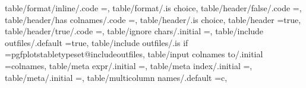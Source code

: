 {{{{{{{{{{{{{{{{{{{{{{{{{{{{{{{table/format/inline/.code                                          ={\def\pgfplotstableread@FORMAT@CASE{1}},                                                                                           
table/format/.is choice,
table/header/false/.code                                           ={\pgfplotstable@firstline@is@headerfalse\pgfplotstable@search@headerfalse},                                                        
table/header/has colnames/.code                                    ={\pgfplotstable@firstline@is@headertrue\pgfplotstable@search@headerfalse},                                                         
table/header/.is choice,
table/header                                                       =true,                                                                                                                              
table/header/true/.code                                            ={\pgfplotstable@firstline@is@headerfalse\pgfplotstable@search@headertrue},                                                         
table/ignore chars/.initial                                        =,                                                                                                                                  
table/include outfiles/.default                                    =true,                                                                                                                              
table/include outfiles/.is if                                      =pgfplotstabletypeset@includeoutfiles,                                                                                              
table/input colnames to/.initial                                   =colnames,%
table/meta expr/.initial                                           =,                                                                                                                                  
table/meta index/.initial                                          =,                                                                                                                                  
table/meta/.initial                                                =,                                                                                                                                  
table/multicolumn names/.default                                   =c,                                                                                                                                 
}}}}}}}}}}}}}}}}}}}}}}}}}}}}}}}
